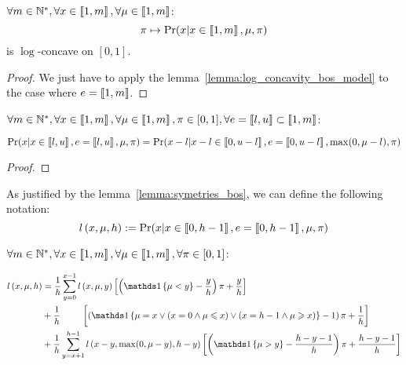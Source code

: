 \begin{thm}
    $\forall m \in \mathbb{N}^*, \forall x \in \left\llbracket1, m\right\rrbracket, \forall \mu \in \left\llbracket1, m\right\rrbracket$:
    \[\pi \mapsto \Pr(x | x \in \left\llbracket1, m\right\rrbracket, \mu, \pi) \] 
    is $\log$-concave on $[0, 1]$.
\end{thm}
\begin{proof}
    We just have to apply the lemma~\ref{lemma:log_concavity_bos_model} to the case where $e = \left\llbracket1, m\right\rrbracket$.
\end{proof}


\begin{lemma}
    \label{lemma:symetries_bos}
    $\forall m \in \mathbb{N}^*, \forall x \in \left\llbracket1, m\right\rrbracket, \forall \mu \in \left\llbracket1, m\right\rrbracket, \pi \in [0, 1], \forall e = \left\llbracket l, u\right\rrbracket \subset \left\llbracket1, m\right\rrbracket$:
    
    \[ \Pr(x | x \in \left\llbracket l, u\right\rrbracket, e = \left\llbracket l, u\right\rrbracket, \mu, \pi) = \Pr(x - l | x - l \in \left\llbracket0, u - l\right\rrbracket, e= \left\llbracket0, u - l\right\rrbracket, \max(0, \mu - l), \pi) \]
\end{lemma}
\begin{proof}
\end{proof}

\begin{definition}
    As justified by the lemma~\ref{lemma:symetries_bos}, we can define the following notation:
    \[ \mathnormal{l}\left(x, \mu, h\right) := \Pr(x | x \in \left\llbracket0, h - 1\right\rrbracket, e = \left\llbracket0, h - 1\right\rrbracket, \mu, \pi) \]
\end{definition}

\begin{thm}
    \label{thm:computing_likelihood_bos}
    $\forall m \in \mathbb{N}^*, \forall x \in \left\llbracket1, m\right\rrbracket, \forall \mu \in \left\llbracket1, m\right\rrbracket, \forall \pi \in [0, 1]$:

\begin{equation}
    \begin{aligned}
        \bosl{x}{\mu}{h}
        &=\frac{1}{h} \sum_{y = 0}^{x - 1} \bosl{x}{\mu}{y} \left[ \left( \indickronecker{\mu < y} - \frac{y}{h} \right) \pi + \frac{y}{h} \right] \\
        &+\frac{1}{h} \ \qquad \left[ \left( \indickronecker{\mu = x \lor (x = 0 \land \mu \leq x) \lor (x = h - 1 \land \mu \geq x)} - 1 \right) \pi +  \frac{1}{h} \right] \\
        &+\frac{1}{h} \sum_{y = x + 1}^{h - 1}\bosl{x - y}{\max(0, \mu - y)}{h - y}    \left[ \left( \indickronecker{\mu > y} - \frac{h - y - 1}{h} \right) \pi + \frac{h - y - 1}{h} \right]
    \end{aligned} \\
\end{equation}
\end{thm}

